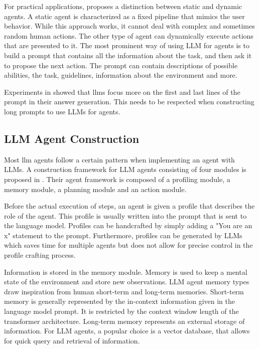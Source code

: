 \documentclass[../main.tex]{subfiles}
\begin{document}
For practical applications, \autocite{Zhu2024} proposes a distinction between static and dynamic agents.
A static agent is characterized as a fixed pipeline that mimics the user behavior.
While this approach works,
it cannot deal with complex and sometimes random human actions.
The other type of agent can dynamically execute actions that are presented to it.
The most prominent way of using LLM for agents
is to build a prompt that contains all the information about the task,
and then ask it to propose the next action.
The prompt can contain descriptions of possible abilities, the task, guidelines,
information about the environment and more.

Experiments in \cite{Liu2023} showed
that \glspl{llm} focus more on the first and last lines of the prompt
in their answer generation.
This needs to be respected when constructing long prompts to use LLMs for agents.

\subsection{LLM Agent Construction}

Most \gls{llm} agents follow a certain pattern
when implementing an agent with LLMs.
A construction framework for LLM agents consisting of four modules
is proposed in \cite{Wang2023}.
Their agent framework is composed of a profiling module, a memory module,
a planning module and an action module.

Before the actual execution of steps, an agent is given a profile that describes
the role of the agent.
This profile is usually written into the prompt that is sent to the language model.
Profiles can be handcrafted by simply adding a "You are an x" statement to the prompt.
Furthermore, profiles can be generated by LLMs which saves time for multiple agents
but does not allow for precise control in the profile crafting process.

Information is stored in the memory module.
Memory is used to keep a mental state of the environment and store new observations.
LLM agent memory types draw inspiration from human short-term and long-term memories.
Short-term memory is generally represented by the in-context information given in the language model prompt.
It is restricted by the context window length of the transformer architecture.
Long-term memory represents an external storage of information.
For LLM agents, a popular choice is a vector database,
that allows for quick query and retrieval of information.
\end{document}
